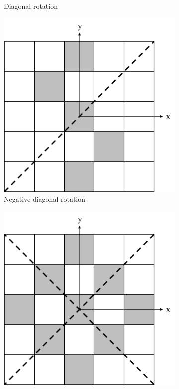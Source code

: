 \begin{figure}[H]
\begin{subfigure}[t]{0.3\textwidth}
		\caption{Diagonal rotation}
	\end{subfigure}
	\hfill
	\begin{subfigure}[t]{0.3\textwidth}
		\centering
		\includegraphics[width=\textwidth]{LSSymRotND.png}
		\caption{Negative diagonal rotation}
	\end{subfigure}
	\hfill
	\begin{subfigure}[t]{0.3\textwidth}
		\centering
		\includegraphics[width=\textwidth]{LSSymRotDND.png}

\end{subfigure}
\end{figure}
